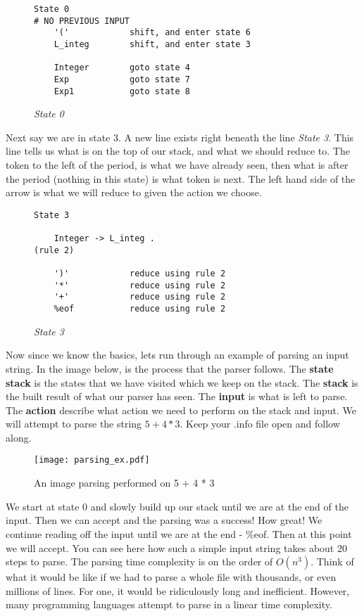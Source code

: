 \documentclass{article}
\begin{document}
\begin{figure}[H]
    \begin{lstlisting}
State 0
# NO PREVIOUS INPUT
	'('            shift, and enter state 6
	L_integ        shift, and enter state 3

	Integer        goto state 4
	Exp            goto state 7
	Exp1           goto state 8
    \end{lstlisting}
    \caption{\textit{State 0}}
\end{figure}

\noindent
Next say we are in state 3. A new line exists right beneath the line \textit{State 3}. This line tells us what is on the top of our stack, and what we should reduce to. The token to the left of the period, is what we have already seen, then what is after the period (nothing in this state) is what token is next. The left hand side of the arrow is what we will reduce to given the action we choose. 

\begin{figure}[H]
    \begin{lstlisting}
State 3

	Integer -> L_integ .                                (rule 2)

	')'            reduce using rule 2
	'*'            reduce using rule 2
	'+'            reduce using rule 2
	%eof           reduce using rule 2
    \end{lstlisting}
    \caption{\textit{State 3}}
\end{figure}

\medskip\noindent
Now since we know the basics, lets run through an example of parsing an input string. In the image below, is the process that the parser follows. The \textbf{state stack} is the states that we have visited which we keep on the stack. The \textbf{stack} is the built result of what our parser has seen. The \textbf{input} is what is left to parse. The \textbf{action} describe what action we need to perform on the stack and input. We will attempt to parse the string $5 + 4 * 3$. Keep your .info file open and follow along.


\begin{figure}[H]
    \centering
    \texttt{[image: parsing\_ex.pdf]}
    \caption{An image parsing performed on 5 + 4 * 3}
    \label{fig:parsing}
\end{figure}

\medskip\noindent
We start at state 0 and slowly build up our stack until we are at the end of the input. Then we can accept and the parsing was a success! How great! We continue reading off the input until we are at the end - \%eof. Then at this point we will accept. You can see here how such a simple input string takes about 20 steps to parse. The parsing time complexity is on the order of $O(n^3)$. Think of what it would be like if we had to parse a whole file with thousands, or even millions of lines. For one, it would be ridiculously long and inefficient. However, many programming languages attempt to parse in a linear time complexity\cite{IPL}. 
\end{document}
